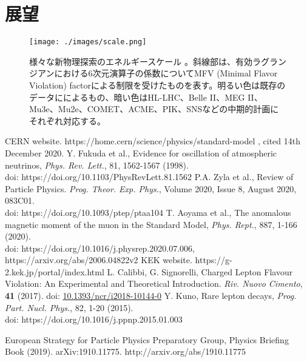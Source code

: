\documentclass[Yonemoto_master.tex]{subfiles}
\begin{document}
\section{展望}
\begin{figure}[h]
\begin{center}
\texttt{[image: ./images/scale.png]}
\caption{様々な新物理探索のエネルギースケール \cite{np_strategy}。斜線部は、有効ラグランジアンにおける6次元演算子の係数についてMFV (Minimal Flavor Violation) factorによる制限を受けたものを表す。明るい色は既存のデータにによるもの、暗い色はHL-LHC、Belle II、MEG II、Mu3e、Mu2e、COMET、ACME、PIK、SNSなどの中期的計画にそれぞれ対応する。}
\label{fig: np_scale}
\end{center}
\end{figure}


{  }{
\begin{thebibliography}{99}
 CERN website. https://home.cern/science/physics/standard-model , cited 14th December 2020.
 Y. Fukuda et al., Evidence for oscillation of atmospheric neutrinos, {\it Phys. Rev. Lett.}, 81, 1562-1567 (1998). \\
doi: https://doi.org/10.1103/PhysRevLett.81.1562
 P.A. Zyla et al., Review of Particle Physics.  {\it Prog. Theor. Exp. Phys.}, Volume 2020, Issue 8, August 2020, 083C01. \\
doi: https://doi.org/10.1093/ptep/ptaa104
 T. Aoyama et al., The anomalous magnetic moment of the muon in the Standard Model, {\it Phys. Rept.}, 887, 1-166 (2020). \\
doi: https://doi.org/10.1016/j.physrep.2020.07.006, https://arxiv.org/abs/2006.04822v2
 KEK website. https://g-2.kek.jp/portal/index.html
 L. Calibbi, G. Signorelli, Charged Lepton Flavour Violation: An Experimental and Theoretical Introduction. {\it Riv. Nuovo Cimento}, {\bf 41} (2017).
doi: \href{https://doi.org/10.1393/ncr/i2018-10144-0}{10.1393/ncr/i2018-10144-0}
 Y. Kuno, Rare lepton decays, {\it Prog. Part. Nucl. Phys.}, 82, 1-20 (2015). \\
doi: https://doi.org/10.1016/j.ppnp.2015.01.003

 European Strategy for Particle Physics Preparatory Group, Physics Briefing Book (2019). arXiv:1910.11775. http://arxiv.org/abs/1910.11775
\end{thebibliography}
}
\end{document}
